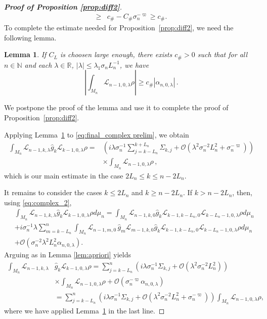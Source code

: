 \documentclass{amsart}
\numberwithin{equation}{section}
\newtheorem{lem}[thm]{Lemma}
\newcommand\cL{{\mathcal L}}
\newcommand\cO{{\mathcal O}}
\newcommand{\Const}{C_{\#}}
\newcommand{\const}{c_{\#}}
\begin{document}
\begin{proof}[\bf \em  Proof of Proposition \ref{prop:diff2}]
\[\begin{split}
\geq& \const -\Const \sigma_n^{-\varpi}\geq \const.
\end{split}
\] 
To complete the estimate needed for Proposition~\ref{prop:diff2}, we need the following lemma.
\begin{lem}
\label{lem:lower rho}
If $C_L$ is choosen large enough, there  exists $\const >0$ such that for all $n \in \mathbb{N}$ and each $\lambda \in \mathbb{R}$, $|\lambda| \le \lambda_1 \sigma_n L_n^{-1}$, we have
\[
\left| \int_{M_n} \cL_{n-1,0,\lambda} \rho \right| \ge \const |\alpha_{n,0,\lambda}| \, .
\]
\end{lem}

We postpone the proof of the lemma and use it to complete the proof of Proposition~\ref{prop:diff2}.

Applying Lemma~\ref{lem:lower rho} to \eqref{eq:final_complex prelim}, we obtain
\begin{equation}
\label{eq:final_complex_1}
\begin{split}
\int_{M_n} \cL_{n-1,k,\lambda}\hat g_k\cL_{k-1,0,\lambda}\rho=&\left(i\lambda\sigma_n^{-1}\!\!\!\sum_{j=k-L_n}^{k+L_n}\Sigma_{k,j}+\cO\left(\lambda^2\sigma_n^{-2}L_n^2+\sigma_n^{-\varpi}\right)\right)\\
&\times \int_{M_n}\cL_{n-1,0,\lambda}\rho \, ,
\end{split}
\end{equation}
which is our main estimate in the case $2L_n \le k \le n-2L_n$.

It remains to consider the cases $k\leq 2L_n$ and $k\geq n-2L_n$. If $k> n-2L_n$, then, using \eqref{eq:complex_2},
\[
\begin{split}
&\int_{M_n} \cL_{n-1,k,\lambda}\hat g_k\cL_{k-1,0,\lambda}\rho d\mu_n=\int_{M_n} \cL_{n-1,k,0}\hat g_k\cL_{k-1,k-L_n,0}\cL_{k-L_n-1,0,\lambda}\rho d\mu_n\\
&+i\sigma_n^{-1}\lambda\sum_{m=k-L_n}^n\int_{M_n}\cL_{n-1,m,0}\,\hat g_m\cL_{m-1,k,0} \hat g_k\cL_{k-1,k-L_n,0}\cL_{k-L_n-1,0,\lambda}\rho d\mu_n\\
&+\cO(\sigma_n^{-2}\lambda^2L_n^2\alpha_{n,0,\lambda}).
\end{split}
\]
Arguing as in Lemma \ref{lem:apriori} yields
\begin{equation}\label{eq:final_complex-2}
\begin{split}
\int_{M_n} \cL_{n-1,k,\lambda}&\hat g_k\cL_{k-1,0,\lambda}\rho  = \sum_{j=k-L_n}^{n}\left(i\lambda\sigma_n^{-1}\Sigma_{k,j}+\cO\left(\lambda^2\sigma_n^{-2}L_n^2\right)\right)\\
&\times \int_{M_n}\cL_{n-1,0,\lambda}\rho+\cO(\sigma_n^{-\varpi}\alpha_{n,0,\lambda}) \\
&=  \sum_{j=k-L_n}^{n}\left(i\lambda\sigma_n^{-1}\Sigma_{k,j}+\cO\left(\lambda^2\sigma_n^{-2}L_n^2 + \sigma_n^{-\varpi} \right)\right)\int_{M_n}\cL_{n-1,0,\lambda}\rho , 
\end{split}
\end{equation}
where we have applied Lemma~\ref{lem:lower rho} in the last line.


\end{proof}
\end{document}

